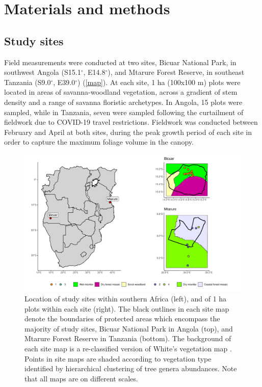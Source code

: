 \documentclass[11pt,a4paper]{article}
\begin{document}
\section{Materials and methods}

\subsection{Study sites}

Field measurements were conducted at two sites, Bicuar National Park, in southwest Angola (S15.1$^\circ$, E14.8$^\circ$), and Mtarure Forest Reserve, in southeast Tanzania (S9.0$^\circ$, E39.0$^\circ$) (\autoref{map}). At each site, 1 ha (100x100 m) plots were located in areas of savanna-woodland vegetation, across a gradient of stem density and a range of savanna floristic archetypes. In Angola, 15 plots were sampled, while in Tanzania, seven were sampled following the curtailment of fieldwork due to COVID-19 travel restrictions. Fieldwork was conducted between February and April at both sites, during the peak growth period of each site in order to capture the maximum foliage volume in the canopy.

\begin{figure}
	\includegraphics[width=\linewidth]{map}
	\caption{Location of study sites within southern Africa (left), and of 1 ha plots within each site (right). The black outlines in each site map denote the boundaries of protected areas which encompass the majority of study sites, Bicuar National Park in Angola (top), and Mtarure Forest Reserve in Tanzania (bottom). The background of each site map is a re-classified version of White's vegetation map \citep{White1983}. Points in site maps are shaded according to vegetation type identified by hierarchical clustering of tree genera abundances. Note that all maps are on different scales.}
	\label{map}
\end{figure}
\end{document}
